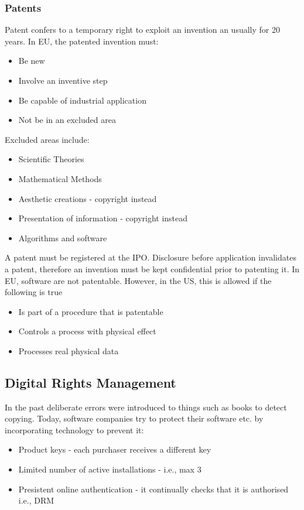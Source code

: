 \documentclass[a4paper]{article}
\theoremstyle{plain}
\theoremstyle{definition}
\theoremstyle{remark}
\begin{document}
\subsubsection{Patents}
Patent confers to a temporary right to exploit an invention an usually for 20 years. In EU, the patented invention must:
\begin{itemize}
	\item Be new
	\item Involve an inventive step
	\item Be capable of industrial application
	\item Not be in an excluded area
\end{itemize}
Excluded areas include:
\begin{itemize}
	\item Scientific Theories
	\item Mathematical Methods
	\item Aesthetic creations - copyright instead
	\item Presentation of information - copyright instead
	\item Algorithms and software
\end{itemize}
A patent must be registered at the IPO. Disclosure before application invalidates a patent, therefore an invention must be kept confidential prior to patenting it. In EU, software are not patentable. However, in the US, this is allowed if the following is true
\begin{itemize}
	\item Is part of a procedure that is patentable
	\item Controls a process with physical effect
	\item Processes real physical data
\end{itemize}
\subsection{Digital Rights Management}
In the past deliberate errors were introduced to things such as books to detect copying. Today, software companies try to protect their software etc. by incorporating technology to prevent it:
\begin{itemize}
	\item Product keys - each purchaser receives a different key
	\item Limited number of active installations - i.e., max 3
	\item Presistent online authentication - it continually checks that it is authorised i.e., DRM
\end{itemize}
\end{document}
